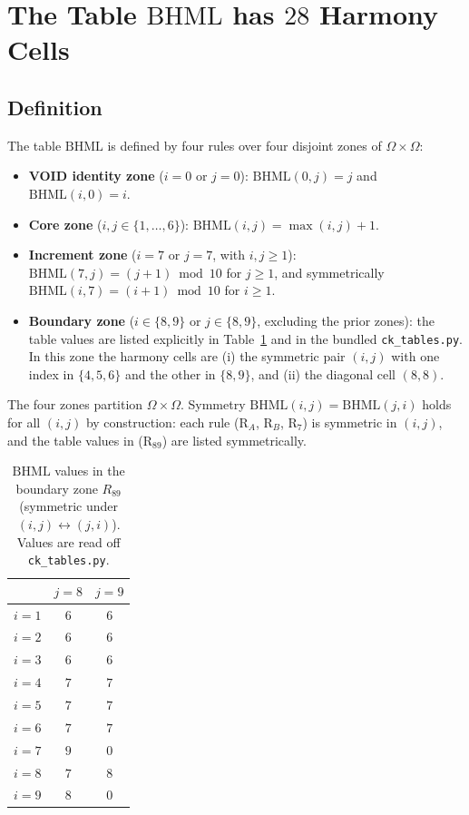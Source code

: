 \documentclass[11pt,reqno]{amsart}
\theoremstyle{plain}
\theoremstyle{definition}
\theoremstyle{remark}
\newcommand{\BHML}{\mathrm{BHML}}
\begin{document}
\section{The Table $\BHML$ has $28$ Harmony Cells}\label{sec:bhml}

\subsection{Definition}

The table $\BHML$ is defined by four rules over four disjoint
zones of $\Omega \times \Omega$:

\begin{itemize}\setlength\itemsep{2pt}
\item[(R$_A$)] \textbf{VOID identity zone} ($i = 0$ or $j = 0$):
$\BHML(0, j) = j$ and $\BHML(i, 0) = i$.
\item[(R$_B$)] \textbf{Core zone} ($i, j \in \{1, \ldots, 6\}$):
$\BHML(i, j) = \max(i, j) + 1$.
\item[(R$_7$)] \textbf{Increment zone} ($i = 7$ or $j = 7$, with
$i, j \ge 1$): $\BHML(7, j) = (j + 1) \bmod 10$ for $j \ge 1$,
and symmetrically $\BHML(i, 7) = (i + 1) \bmod 10$ for $i \ge 1$.
\item[(R$_{89}$)] \textbf{Boundary zone} ($i \in \{8, 9\}$ or
$j \in \{8, 9\}$, excluding the prior zones): the table values
are listed explicitly in Table~\ref{tab:bhml-r89} and in the
bundled \texttt{ck\_tables.py}. In this zone the harmony cells
are (i) the symmetric pair $(i, j)$ with one index in
$\{4, 5, 6\}$ and the other in $\{8, 9\}$, and (ii) the diagonal
cell $(8, 8)$.
\end{itemize}

The four zones partition $\Omega \times \Omega$. Symmetry
$\BHML(i, j) = \BHML(j, i)$ holds for all $(i, j)$ by construction:
each rule (R$_A$, R$_B$, R$_7$) is symmetric in $(i, j)$, and the
table values in (R$_{89}$) are listed symmetrically.

\begin{table}[h]
\caption{$\BHML$ values in the boundary zone $R_{89}$ (symmetric
under $(i, j) \leftrightarrow (j, i)$). Values are read off
\texttt{ck\_tables.py}.}
\label{tab:bhml-r89}
\centering
\begin{tabular}{c|cc}
& $j = 8$ & $j = 9$ \\ \hline
$i = 1$ & $6$ & $6$ \\
$i = 2$ & $6$ & $6$ \\
$i = 3$ & $6$ & $6$ \\
$i = 4$ & $7$ & $7$ \\
$i = 5$ & $7$ & $7$ \\
$i = 6$ & $7$ & $7$ \\
$i = 7$ & $9$ & $0$ \\
$i = 8$ & $7$ & $8$ \\
$i = 9$ & $8$ & $0$ \\
\end{tabular}
\end{table}
\end{document}
